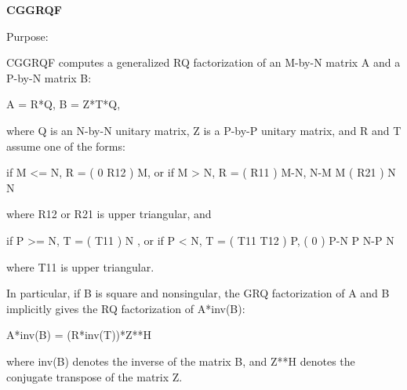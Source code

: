 {\bfseries C\+G\+G\+R\+Q\+F} 

 \begin{DoxyParagraph}{Purpose\+: }
\begin{DoxyVerb} CGGRQF computes a generalized RQ factorization of an M-by-N matrix A
 and a P-by-N matrix B:

             A = R*Q,        B = Z*T*Q,

 where Q is an N-by-N unitary matrix, Z is a P-by-P unitary
 matrix, and R and T assume one of the forms:

 if M <= N,  R = ( 0  R12 ) M,   or if M > N,  R = ( R11 ) M-N,
                  N-M  M                           ( R21 ) N
                                                      N

 where R12 or R21 is upper triangular, and

 if P >= N,  T = ( T11 ) N  ,   or if P < N,  T = ( T11  T12 ) P,
                 (  0  ) P-N                         P   N-P
                    N

 where T11 is upper triangular.

 In particular, if B is square and nonsingular, the GRQ factorization
 of A and B implicitly gives the RQ factorization of A*inv(B):

              A*inv(B) = (R*inv(T))*Z**H

 where inv(B) denotes the inverse of the matrix B, and Z**H denotes the
 conjugate transpose of the matrix Z.\end{DoxyVerb}
 
\end{DoxyParagraph}

